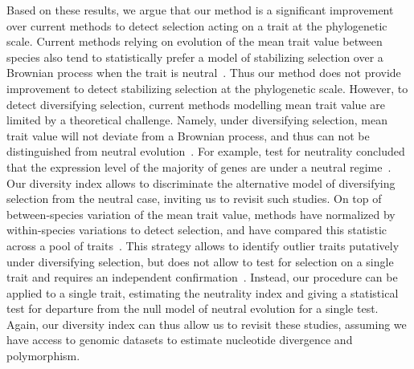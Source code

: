 \documentclass{article}
\begin{document}
Based on these results, we argue that our method is a significant improvement over current methods to detect selection acting on a trait at the phylogenetic scale.
Current methods relying on evolution of the mean trait value between species also tend to statistically prefer a model of stabilizing selection over a Brownian process when the trait is neutral~\parencite{silvestro_measurement_2015, cooper_cautionary_2016, price_detecting_2022}.
Thus our method does not provide improvement to detect stabilizing selection at the phylogenetic scale.
However, to detect diversifying selection, current methods modelling mean trait value are limited by a theoretical challenge.
Namely, under diversifying selection, mean trait value will not deviate from a Brownian process, and thus can not be distinguished from neutral evolution~\parencite{hansen_translating_1996, harmon_phylogenetic_2018}.
For example, test for neutrality concluded that the expression level of the majority of genes are under a neutral regime~\parencite{catalan_drift_2019}.
Our diversity index allows to discriminate the alternative model of diversifying selection from the neutral case, inviting us to revisit such studies.
On top of between-species variation of the mean trait value, methods have normalized by within-species variations to detect selection, and have compared this statistic across a pool of traits~\parencite{rohlfs_modeling_2014, rohlfs_phylogenetic_2015}.
This strategy allows to identify outlier traits putatively under diversifying selection, but does not allow to test for selection on a single trait and requires an independent confirmation~\parencite{rohlfs_phylogenetic_2015, gillard_comparative_2021}.
Instead, our procedure can be applied to a single trait, estimating the neutrality index and giving a statistical test for departure from the null model of neutral evolution for a single test.
Again, our diversity index can thus allow us to revisit these studies, assuming we have access to genomic datasets to estimate nucleotide divergence and polymorphism.
\end{document}
